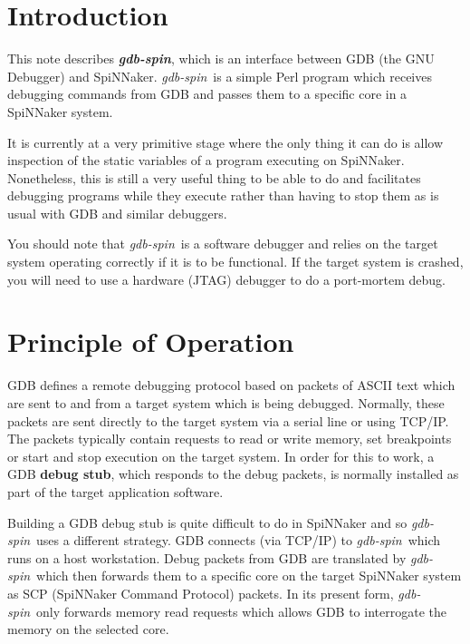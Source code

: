 
\def\FullTitle{\textsl{gdb-spin} - GDB SpiNNaker Interface}
\def\ShortTitle{\textsl{gdb-spin}}
\def\Date{8 Mar 2016}
\def\Version{2.0.0}
\def\Author{Steve Temple}
\def\Email{steven.temple@manchester.ac.uk}




\newcommand{\gdbspin}{\textsl{gdb-spin}}

\section{Introduction}

This note describes \textbf{\gdbspin}, which is an interface between
GDB (the GNU Debugger) and SpiNNaker. \gdbspin\ is a simple Perl
program which receives debugging commands from GDB and passes them to
a specific core in a SpiNNaker system.

It is currently at a very primitive stage where the only thing it can
do is allow inspection of the static variables of a program executing
on SpiNNaker. Nonetheless, this is still a very useful thing to be
able to do and facilitates debugging programs while they execute
rather than having to stop them as is usual with GDB and similar
debuggers.

You should note that \gdbspin\ is a software debugger and relies on
the target system operating correctly if it is to be functional. If
the target system is crashed, you will need to use a hardware (JTAG)
debugger to do a port-mortem debug.

\section{Principle of Operation}

GDB defines a remote debugging protocol based on packets of ASCII text
which are sent to and from a target system which is being
debugged. Normally, these packets are sent directly to the target
system via a serial line or using TCP/IP. The packets typically
contain requests to read or write memory, set breakpoints or start and
stop execution on the target system. In order for this to work, a
GDB \textbf{debug stub}, which responds to the debug packets, is
normally installed as part of the target application software.

Building a GDB debug stub is quite difficult to do in SpiNNaker and
so \gdbspin\ uses a different strategy. GDB connects (via TCP/IP)
to \gdbspin\ which runs on a host workstation. Debug packets from GDB
are translated by \gdbspin\ which then forwards them to a specific
core on the target SpiNNaker system as SCP (SpiNNaker Command
Protocol) packets. In its present form, \gdbspin\ only forwards memory
read requests which allows GDB to interrogate the memory on the
selected core.

